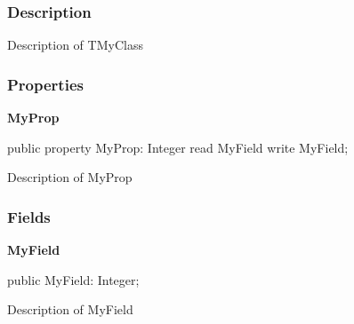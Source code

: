 \documentclass{report}
\newif\ifpdf
\begin{document}
\subsubsection*{\large{\textbf{Description}}\normalsize\hspace{1ex}\hfill}
Description of TMyClass\subsubsection*{\large{\textbf{Properties}}\normalsize\hspace{1ex}\hfill}
\begin{list}{}{
\setlength{\itemindent}{0cm}
\setlength{\listparindent}{0cm}
\setlength{\leftmargin}{\evensidemargin}
\addtolength{\leftmargin}{\tmplength}
\settowidth{\labelsep}{X}
\addtolength{\leftmargin}{\labelsep}
\setlength{\labelwidth}{\tmplength}
}
\label{ok_back_comment.TMyClass-MyProp}
\item[\textbf{MyProp}\hfill]
\ifpdf
\begin{flushleft}
\fi
\begin{ttfamily}
public property MyProp: Integer read MyField write MyField;\end{ttfamily}

\ifpdf
\end{flushleft}
\fi


\par Description of MyProp\end{list}
\subsubsection*{\large{\textbf{Fields}}\normalsize\hspace{1ex}\hfill}
\begin{list}{}{
\setlength{\itemindent}{0cm}
\setlength{\listparindent}{0cm}
\setlength{\leftmargin}{\evensidemargin}
\addtolength{\leftmargin}{\tmplength}
\settowidth{\labelsep}{X}
\addtolength{\leftmargin}{\labelsep}
\setlength{\labelwidth}{\tmplength}
}
\label{ok_back_comment.TMyClass-MyField}
\item[\textbf{MyField}\hfill]
\ifpdf
\begin{flushleft}
\fi
\begin{ttfamily}
public MyField: Integer;\end{ttfamily}

\ifpdf
\end{flushleft}
\fi


\par Description of MyField\end{list}
\end{document}
